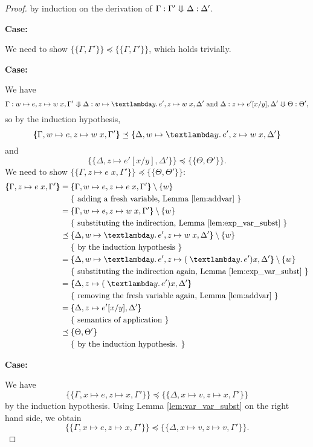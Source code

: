 \documentclass{scrartcl}
\theoremstyle{nonumberbreak}
\newtheorem{proof}{Proof}
\newcommand{\sApp}[2]{#1\;#2}
\newcommand{\sLam}[2]{\text{\textlambda} #1.\, #2}
\newcommand{\ssred}[4]{#1 : #2 \mathrel{\rotatebox[origin=c]{90}{$\Lleftarrow$}} #3 : #4}
\newcommand{\sRule}[1]{\text{{\textsc{#1}}}}
\newcommand{\esem}[1]{\{\!\!\!\{#1\}\!\!\!\}}
\newcommand{\case}[1]{\par\smallskip\noindent\textbf{Case:} #1\nopagebreak\par\noindent\ignorespaces}
\newcommand{\aexpl}[1]{&\mathrel{\phantom{=}}\left\{\text{ #1 }\right\}}
\begin{document}
\begin{proof}
by induction on the derivation of $\ssred \Gamma {\Gamma'} {\Delta} {\Delta'}$.

\case{\sRule{Lam}}
We need to show $\esem{\Gamma, \Gamma'} \preceq \esem{\Gamma, \Gamma'}$, which holds trivially.

\case{\sRule{App}}
We have
\[
\ssred{\Gamma}{w \mapsto e, z \mapsto \sApp w x, \Gamma'}{\Delta}{w \mapsto \sLam y e', z \mapsto \sApp w x, \Delta'}
\text{ and }
\ssred{\Delta}{z \mapsto e'[x/y], \Delta'}{\Theta}{\Theta'},
\]
so by the induction hypothesis,
\[
\esem{\Gamma, w \mapsto e, z \mapsto \sApp w x, \Gamma'} \preceq \esem{\Delta, w \mapsto \sLam y e', z \mapsto \sApp w x, \Delta'}
\]
and
\[
\esem{\Delta,z \mapsto e'[x/y], \Delta'} \preceq \esem{\Theta,\Theta'}.
\]
We need to show $\esem{\Gamma, z \mapsto \sApp e x, \Gamma'} \preceq \esem{\Theta,\Theta'}$:
\begin{align*}
\esem{\Gamma, z \mapsto \sApp e x, \Gamma'} &= \esem{\Gamma, w \mapsto e, z\mapsto \sApp e x, \Gamma'} \setminus \{w\} \\
\aexpl{adding a fresh variable, Lemma \ref{lem:addvar}} \\
&= \esem{\Gamma, w \mapsto e, z \mapsto \sApp w x, \Gamma'} \setminus \{w\} \\
\aexpl{substituting the indirection, Lemma \ref{lem:exp_var_subst}} \\
&\preceq \esem{\Delta, w \mapsto \sLam y e', z \mapsto \sApp w x, \Delta'} \setminus \{w\}\\
\aexpl{by the induction hypothesis} \\
&= \esem{\Delta, w \mapsto \sLam y e', z \mapsto \sApp (\sLam y e') x, \Delta'} \setminus \{w\} \\
\aexpl{substituting the indirection again, Lemma \ref{lem:exp_var_subst}} \\
&= \esem{\Delta, z \mapsto \sApp (\sLam y e') x, \Delta'}\\
\aexpl{removing the fresh variable again, Lemma \ref{lem:addvar}} \\
&= \esem{\Delta, z \mapsto e'[x/y], \Delta'} \\
\aexpl{semantics of application} \\
&\preceq \esem{\Theta,\Theta'}\\
\aexpl{by the induction hypothesis.}
\end{align*}

\case{\sRule{Var}}
We have 
\[
\esem{\Gamma, x \mapsto e, z\mapsto x, \Gamma'} \preceq \esem{\Delta, x \mapsto v, z\mapsto x, \Gamma'}
\]
by the induction hypothesis. Using Lemma \ref{lem:var_var_subst} on the right hand side, we obtain
\[
\esem{\Gamma, x\mapsto e,z \mapsto x, \Gamma'} \preceq \esem{\Delta, x \mapsto v, z \mapsto v, \Gamma'}.
\]


\end{proof}
\end{document}
